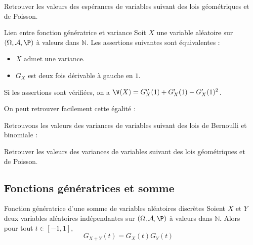 \documentclass[french,11pt,twoside]{VcCours}
\begin{document}
\begin{ApplicationDirecte}{} Retrouver les valeurs des espérances de variables suivant des lois géométriques et de Poisson.
\end{ApplicationDirecte}

\begin{Proposition}{Lien entre fonction génératrice et variance} Soit $X$ une variable aléatoire sur $(\Omega, \mathcal{A}, \P)$ à valeurs dans $\mathbb{N}$. Les assertions suivantes sont équivalentes :

\begin{itemize}
\item $X$ admet une variance.
\item $G_X$ est deux fois dérivable à gauche en $1$.
\end{itemize}
Si les assertions sont vérifiées, on a $\V(X)=G_X''(1)+G_X'(1)-G_X'(1)^2$.
\end{Proposition}

\begin{Remarque}{} On peut retrouver facilement cette égalité :

\vspace{4cm}
\end{Remarque}

\begin{Exemple}{} Retrouvons les valeurs des variances de variables suivant des lois de Bernoulli et binomiale :

\vspace{5cm}
\end{Exemple}

\begin{ApplicationDirecte}{} Retrouver les valeurs des variances de variables suivant des lois géométriques et de Poisson.
\end{ApplicationDirecte}

\subsection{Fonctions génératrices et somme}

\begin{Proposition}{Fonction génératrice d'une somme de variables aléatoires discrètes}
Soient $X$ et $Y$ deux variables aléatoires indépendantes sur $(\Omega, \mathcal{A}, \P)$ à valeurs dans $\mathbb{N}$. Alors pour tout $t \in [-1,1]$,
$$ G_{X+Y}(t) = G_X(t) G_Y(t)$$
\end{Proposition}

\begin{Demonstration}{}

\vspace{3cm}
\end{Demonstration}
\end{document}
